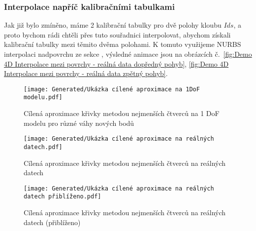 \subsubsection{Interpolace napříč kalibračními tabulkami}
Jak již bylo zmíněno, máme 2 kalibrační tabulky pro dvě polohy kloubu $Ids$, a proto bychom rádi chtěli přes tuto souřadnici interpolovat, abychom získali kalibrační tabulky mezi těmito dvěma polohami. K tomuto využijeme NURBS interpolaci nadpovrchu ze sekce , výsledné animace jsou na obrázcích č.~\ref{fig:Demo 4D Interpolace mezi povrchy - reálná data dopředný pohyb},
\ref{fig:Demo 4D Interpolace mezi povrchy - reálná data zpětný pohyb}.
\begin{figure}[H]
    \centering
    \texttt{[image: Generated/Ukázka cílené aproximace na 1DoF modelu.pdf]}
    \caption{Cílená aproximace křivky metodou nejmenších čtverců na 1 DoF modelu
        pro různé váhy nových bodů}
    \label{fig:Cílená aproximace křivky 1 DoF}
\end{figure}
\begin{imagepage}
    \begin{figure}[H]
        \centering
        \texttt{[image: Generated/Ukázka cílené aproximace na reálných datech.pdf]}
        \caption{Cílená aproximace křivky metodou nejmenších čtverců na reálných datech}
        \label{fig:Cílená aproximace křivky}
    \end{figure}
    \begin{figure}[H]
        \centering
        \texttt{[image: Generated/Ukázka cílené aproximace na reálných datech přiblíženo.pdf]}
        \caption{Cílená aproximace křivky metodou nejmenších čtverců na reálných datech (přiblíženo)}
        \label{fig:Cílená aproximace křivky přiblíženo}
    \end{figure}
\end{imagepage}

